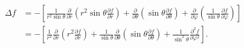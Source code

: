 \begin{equation}
\begin{aligned}
 \Delta f
 &=-\left[\frac1{r^2\sin\theta}\frac{\partial}{\partial r}
 \left(r^2\sin\theta\frac{\partial f}{\partial r}\right)
 +\frac{\partial}{\partial\theta}\left(\sin\theta\frac{\partial f}{\partial\theta}\right)
 +\frac{\partial}{\partial\varphi}\left(\frac1{\sin\theta}\frac{\partial f}{\partial\varphi}\right)\right]\\
 &=-\left[\frac1{r^2}\frac{\partial}{\partial r}\left(r^2\frac{\partial f}{\partial r}\right)
 +\frac1{\sin\theta}\frac{\partial}{\partial\theta}\left(\sin\theta\frac{\partial f}{\partial\theta}\right)
 +\frac1{\sin^2\theta}\frac{\partial^2f}{\partial\varphi^2}\right].
\end{aligned}
 \tag{49}
\end{equation}

